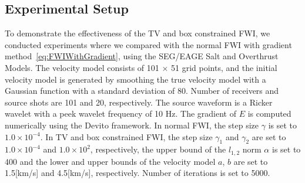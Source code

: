 \subsection{Experimental Setup}\label{subsec:experimental-setup}
%
%
%
To demonstrate the effectiveness of the TV and box constrained FWI, we conducted experiments where we compared with the normal FWI with gradient method~\eqref{eq:FWIWithGradient}, using the SEG/EAGE Salt and Overthrust Models.
The velocity model consists of 101 $\times$ 51 grid points, and the initial velocity model is generated by smoothing the true velocity model with a Gaussian function with a standard deviation of 80.
Number of receivers and source shots are 101 and 20, respectively.
The source waveform is a Ricker wavelet with a peek wavelet frequency of 10 Hz.
The gradient of $E$ is computed numerically using the Devito framework\cite{devito}.
In normal FWI, the step size $\gamma$ is set to $1.0 \times 10^{-4}$.
In TV and box constrained FWI, the step size $\gamma_1$ and $\gamma_2$ are set to $1.0 \times 10^{-4}$ and $1.0 \times 10^2$, respectively, the upper bound of the $l_{1,2}$ norm $\alpha$ is set to 400 and the lower and upper bounds of the velocity model $a$, $b$ are set to 1.5[km/s] and 4.5[km/s], respectively.
Number of iterations is set to 5000.


